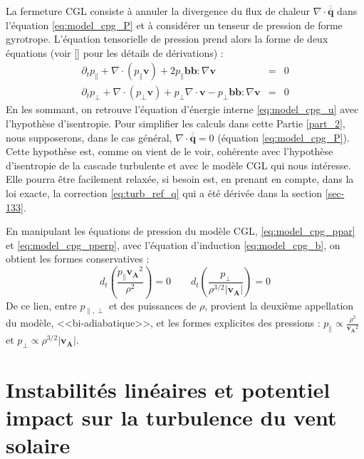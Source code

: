 La fermeture \ac{CGL} consiste à annuler la divergence du flux de chaleur $\nabla \cdot \overline{\overline{\boldsymbol{q}}}$ dans l'équation \eqref{eq:model_cpg_P} et à considérer un tenseur de pression de forme gyrotrope. L'équation tensorielle de pression prend alors la forme de deux équations (voir [\cite{hunana_introductory_2019}] pour les détails de dérivations) : 
\begin{eqnarray}
\label{eq:model_cpg_ppar}     \partial_t p_{\parallel} + \nabla \cdot \left(p_{\parallel} \boldsymbol{v} \right) + 2 p_{\parallel} \boldsymbol{b}\boldsymbol{b} : \nabla \boldsymbol{v}   &=& 0 \\
\label{eq:model_cpg_pperp}     \partial_t p_{\perp} + \nabla \cdot \left(p_{\perp} \boldsymbol{v} \right) + p_{\perp} \nabla \cdot \boldsymbol{v}- p_{\perp} \boldsymbol{b}\boldsymbol{b} : \nabla \boldsymbol{v}   &=& 0 
\end{eqnarray}
En les sommant, on retrouve l'équation d'énergie interne \eqref{eq:model_cpg_u} avec l'hypothèse d'isentropie. Pour simplifier les calculs dans cette Partie \ref{part_2}, nous supposerons, dans le cas général, $\nabla \cdot \overline{\overline{\boldsymbol{q}}} = 0$ (équation \eqref{eq:model_cpg_P}). Cette hypothèse est, comme on vient de le voir, cohérente avec l'hypothèse d'isentropie de la cascade turbulente et avec le modèle \ac{CGL} qui nous intéresse. Elle pourra être facilement relaxée, si besoin est, en prenant en compte, dans la loi exacte, la correction \eqref{eq:turb_ref_q} qui a été dérivée dans la section \ref{sec-133}.

En manipulant les équations de pression du modèle \ac{CGL}, \eqref{eq:model_cpg_ppar} et \eqref{eq:model_cpg_pperp}, avec l'équation d'induction \eqref{eq:model_cpg_b}, on obtient les formes conservatives : 
\begin{equation}
\label{eq:model_cpg_biadiab}    d_t \left(\frac{p_{\parallel}\boldsymbol{v_A}^2}{\rho^2}\right) = 0\qquad d_t \left(\frac{p_{\perp}}{\rho^{3/2} |\boldsymbol{v_A}|}\right)=0
\end{equation}
De ce lien, entre $p_{\parallel,\perp}$ et des puissances de $\rho$, provient la deuxième appellation du modèle, <<bi-adiabatique>>, et les formes explicites des pressions : $p_{\parallel} \propto \frac{\rho^2}{\boldsymbol{v_A}^2}$ et $p_{\perp}\propto \rho^{3/2} |\boldsymbol{v_A}|$. 

\section{Instabilités linéaires et potentiel impact sur la turbulence du vent solaire}
\label{sec-212}

